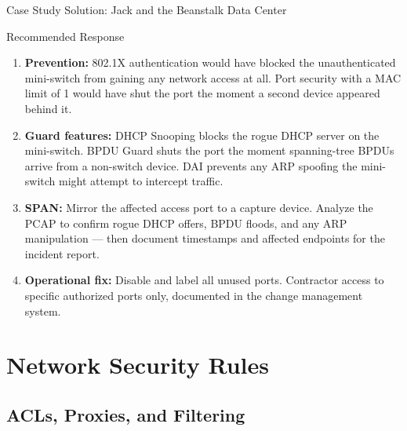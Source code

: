 \documentclass[aspectratio=169]{beamer}  %
\begin{document}
\begin{frame}{Case Study Solution: Jack and the Beanstalk Data Center}
    \begin{exampleblock}{Recommended Response}
        \footnotesize
        \begin{enumerate}
            \item \textbf{Prevention:} 802.1X authentication would have blocked the unauthenticated mini-switch from gaining any network access at all. Port security with a MAC limit of 1 would have shut the port the moment a second device appeared behind it.
            \item \textbf{Guard features:} DHCP Snooping blocks the rogue DHCP server on the mini-switch. BPDU Guard shuts the port the moment spanning-tree BPDUs arrive from a non-switch device. DAI prevents any ARP spoofing the mini-switch might attempt to intercept traffic.
            \item \textbf{SPAN:} Mirror the affected access port to a capture device. Analyze the PCAP to confirm rogue DHCP offers, BPDU floods, and any ARP manipulation --- then document timestamps and affected endpoints for the incident report.
            \item \textbf{Operational fix:} Disable and label all unused ports. Contractor access to specific authorized ports only, documented in the change management system.
        \end{enumerate}
    \end{exampleblock}
\end{frame}

\section{Network Security Rules}
\subsection{ACLs, Proxies, and Filtering}

\end{document}
